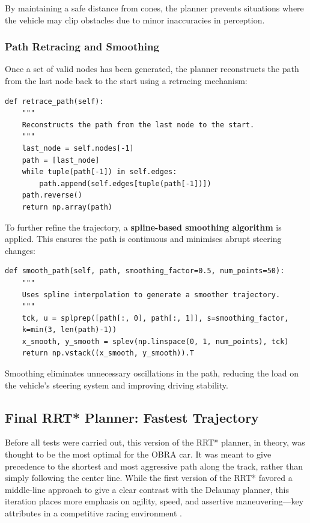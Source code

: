 \documentclass[a4paper,11pt]{report}
\begin{document}
By maintaining a safe distance from cones, the planner prevents situations where the vehicle may clip obstacles due to minor inaccuracies in perception.

\subsubsection*{Path Retracing and Smoothing}

Once a set of valid nodes has been generated, the planner reconstructs the path 
from the last node back to the start using a retracing mechanism:

\begin{verbatim}
def retrace_path(self):
    """
    Reconstructs the path from the last node to the start.
    """
    last_node = self.nodes[-1]
    path = [last_node]
    while tuple(path[-1]) in self.edges:
        path.append(self.edges[tuple(path[-1])])
    path.reverse()
    return np.array(path)
\end{verbatim}

To further refine the trajectory, a \textbf{spline-based smoothing algorithm} is applied. 
This ensures the path is continuous and minimises abrupt steering changes:

\begin{verbatim}
def smooth_path(self, path, smoothing_factor=0.5, num_points=50):
    """
    Uses spline interpolation to generate a smoother trajectory.
    """
    tck, u = splprep([path[:, 0], path[:, 1]], s=smoothing_factor, 
    k=min(3, len(path)-1))  
    x_smooth, y_smooth = splev(np.linspace(0, 1, num_points), tck)
    return np.vstack((x_smooth, y_smooth)).T
\end{verbatim}

Smoothing eliminates unnecessary oscillations in the path, 
reducing the load on the vehicle's steering system and improving driving stability.


\subsection{Final RRT* Planner: Fastest Trajectory}

Before all tests were carried out, this version of the RRT* planner, in theory, 
was thought to be the most optimal for the OBRA car. It was meant to give precedence 
to the shortest and most aggressive path along the track, rather than simply following 
the center line. While the first version of the RRT* favored a middle-line approach to 
give a clear contrast with the Delaunay planner, this iteration places more emphasis on agility, 
speed, and assertive maneuvering—key attributes in a competitive racing environment \cite{reference4}.
\end{document}
